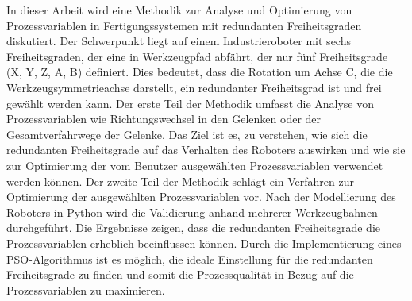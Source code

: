 {%
	In dieser Arbeit wird eine Methodik zur Analyse und Optimierung von Prozessvariablen in Fertigungssystemen mit redundanten Freiheitsgraden diskutiert. Der Schwerpunkt liegt auf einem Industrieroboter mit sechs Freiheitsgraden, der eine in Werkzeugpfad abfährt, der nur fünf Freiheitsgrade (X, Y, Z, A, B) definiert. Dies bedeutet, dass die Rotation um Achse C, die die Werkzeugsymmetrieachse darstellt, ein redundanter Freiheitsgrad ist und frei gewählt werden kann. Der erste Teil der Methodik umfasst die Analyse von Prozessvariablen wie Richtungswechsel in den Gelenken oder der Gesamtverfahrwege der Gelenke. Das Ziel ist es, zu verstehen, wie sich die redundanten Freiheitsgrade auf das Verhalten des Roboters auswirken und wie sie zur Optimierung der vom Benutzer ausgewählten Prozessvariablen verwendet werden können. Der zweite Teil der Methodik schlägt ein Verfahren zur Optimierung der ausgewählten Prozessvariablen vor. Nach der Modellierung des Roboters in Python wird die Validierung anhand mehrerer Werkzeugbahnen durchgeführt. Die Ergebnisse zeigen, dass die redundanten Freiheitsgrade die Prozessvariablen erheblich beeinflussen können. Durch die Implementierung eines \acrshort{PSO}-Algorithmus ist es möglich, die ideale Einstellung für die redundanten Freiheitsgrade zu finden und somit die Prozessqualität in Bezug auf die Prozessvariablen zu maximieren.
	
	
}%
%
%
